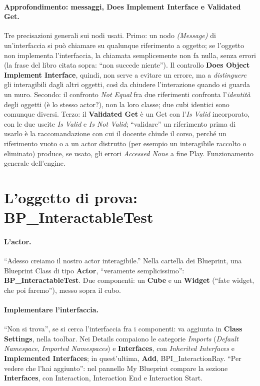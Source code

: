 \paragraph{Approfondimento: messaggi, Does Implement Interface e Validated Get.} Tre
precisazioni generali sui nodi usati. Primo: un nodo \emph{(Message)} di un'interfaccia si
può chiamare su qualunque riferimento a oggetto; se l'oggetto non implementa l'interfaccia,
la chiamata semplicemente non fa nulla, senza errori (la frase del libro citata sopra: ``non
succede niente''). Il controllo \textbf{Does Object Implement Interface}, quindi, non serve
a evitare un errore, ma a \emph{distinguere} gli interagibili dagli altri oggetti, così da
chiudere l'interazione quando si guarda un muro. Secondo: il confronto \emph{Not Equal} fra
due riferimenti confronta l'\emph{identità} degli oggetti (è lo stesso actor?), non la loro
classe; due cubi identici sono comunque diversi. Terzo: il \textbf{Validated Get} è un Get
con l'\emph{Is Valid} incorporato, con le due uscite \emph{Is Valid} e \emph{Is Not Valid};
``validare'' un riferimento prima di usarlo è la raccomandazione con cui il docente chiude
il corso, perché un riferimento vuoto o a un actor distrutto (per esempio un interagibile
raccolto o eliminato) produce, se usato, gli errori \emph{Accessed None} a fine Play.
Funzionamento generale dell'engine.

\section{L'oggetto di prova: BP\_InteractableTest}
\label{ue12:sec:test}

\paragraph{L'actor.} ``Adesso creiamo il nostro actor interagibile.'' Nella cartella dei
Blueprint, una Blueprint Class di tipo \textbf{Actor}, ``veramente semplicissimo'':
\textbf{BP\_InteractableTest}. Due componenti: un \textbf{Cube} e un \textbf{Widget}
(``fate widget, che poi faremo''), messo sopra il cubo.

\paragraph{Implementare l'interfaccia.} ``Non si trova'', se si cerca l'interfaccia fra i
componenti: va aggiunta in \textbf{Class Settings}, nella toolbar. Nei Details compaiono le
categorie \emph{Imports} (\emph{Default Namespace}, \emph{Imported Namespaces}) e
\textbf{Interfaces}, con \emph{Inherited Interfaces} e \textbf{Implemented Interfaces}; in
quest'ultima, \textbf{Add}, BPI\_InteractionRay. ``Per vedere che l'hai aggiunto'': nel
pannello My Blueprint compare la sezione \textbf{Interfaces}, con Interaction, Interaction End
e Interaction Start.

